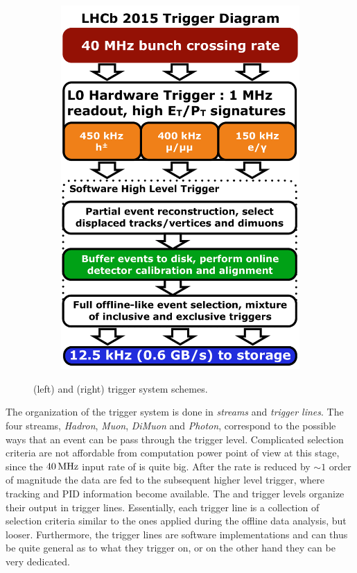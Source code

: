 \begin{figure}[t]
\begin{subfigure}{0.5\textwidth}
    \includegraphics[width=\textwidth]{Figures/Chapter2/LHCb_Trigger_RunII_May2015}
    \caption{}
    \label{det_run_two_trigger}
  \end{subfigure}
  \caption{ \runone (left) and \runtwo (right) trigger system schemes.}
  \label{det_trigger_scheams}
\end{figure}

The organization of the trigger system is done in {\it streams} and {\it trigger lines}.
The four streams, {\it Hadron}, {\it Muon}, {\it DiMuon} and {\it Photon}, correspond to the possible
ways that an event can be pass through the \lzero trigger level. Complicated selection criteria are
not affordable from computation power point of view at this stage, since the $40{\rm \,MHz}$ input rate of \lzero is quite
big. After the rate is reduced by $\sim 1$ order of magnitude the data are fed to the subsequent
higher level trigger, where tracking and PID information become available. The \hltone and \hlttwo
trigger levels organize their output in trigger lines. Essentially, each trigger line is a collection
of selection criteria similar to the ones applied during the offline data analysis, but looser.
Furthermore, the trigger lines are software implementations and can thus be quite general as to what
they trigger on, or on the other hand they can be very dedicated.

